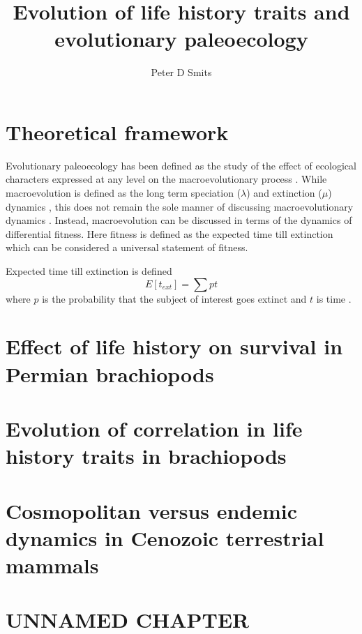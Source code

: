 \documentclass[12pt,letterpaper]{article}
\title{Evolution of life history traits and evolutionary paleoecology}
\author[1]{Peter D Smits}
\affil[1]{\footnotesize{\href{mailto:psmits@uchicago.edu}{psmits@uchicago.edu}, Committee on Evolutionary Biology, University of Chicago}}
\begin{document}
\maketitle

\section{Theoretical framework}
Evolutionary paleoecology has been defined as the study of the effect of ecological characters expressed at any level on the macroevolutionary process \citep{Kitchell1985a}. While macroevolution is defined as the long term speciation (\(\lambda\)) and extinction (\(\mu\)) dynamics \citep{Jablonski2008a}, this does not remain the sole manner of discussing macroevolutionary dynamics \citep{Kitchell1985a,Kitchell1990}. Instead, macroevolution can be discussed in terms of the dynamics of differential fitness. Here fitness is defined as the expected time till extinction \citep{Cooper1984} which can be considered a universal statement of fitness.

Expected time till extinction is defined
\begin{equation}
  E[t_{ext}] = \sum p t
  \label{eq:ete}
\end{equation}
where \(p\) is the probability that the subject of interest goes extinct and \(t\) is time \citep{Cooper1984}.


\section{Effect of life history on survival in Permian brachiopods}

\section{Evolution of correlation in life history traits in brachiopods}

\section{Cosmopolitan versus endemic dynamics in Cenozoic terrestrial mammals}

\section{UNNAMED CHAPTER}



\end{document}
